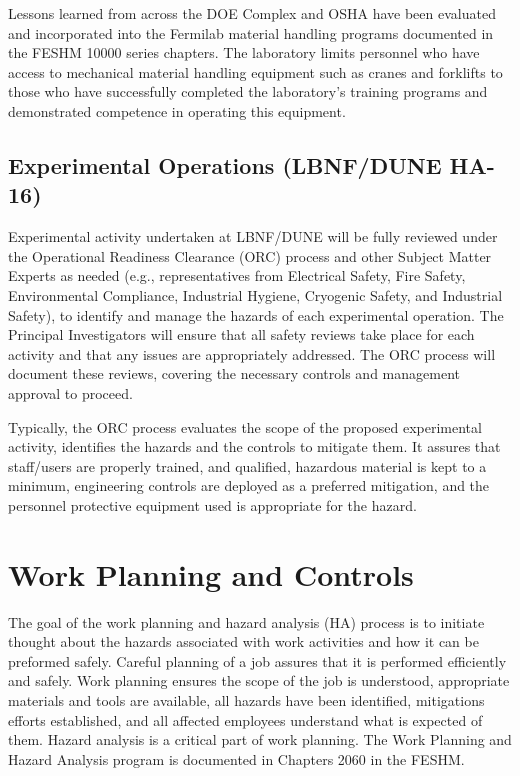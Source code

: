 Lessons learned from across the DOE Complex and OSHA have been
evaluated and incorporated into the Fermilab material handling
programs documented in the FESHM 10000 series chapters.  The
laboratory limits personnel who have access to mechanical material
handling equipment such as cranes and forklifts to those who have
successfully completed the laboratory's training programs and
demonstrated competence in operating this equipment.


\subsection{Experimental Operations (LBNF/DUNE HA-16)}

Experimental activity undertaken at LBNF/DUNE will be fully reviewed
under the Operational Readiness Clearance (ORC) process and other
Subject Matter Experts as needed (e.g., representatives from
Electrical Safety, Fire Safety, Environmental Compliance, Industrial
Hygiene, Cryogenic Safety, and Industrial Safety), to identify and
manage the hazards of each experimental operation. The Principal
Investigators will ensure that all safety reviews take place for each
activity and that any issues are appropriately addressed. The ORC
process will document these reviews, covering the necessary controls
and management approval to proceed.

Typically, the ORC process evaluates the scope of the proposed
experimental activity, identifies the hazards and the controls to
mitigate them. It assures that staff/users are properly trained, and
qualified, hazardous material is kept to a minimum, engineering
controls are deployed as a preferred mitigation, and the personnel
protective equipment used is appropriate for the hazard.

\section{Work Planning and Controls}

The goal of the work planning and hazard analysis (HA) process is to
initiate thought about the hazards associated with work activities and
how it can be preformed safely. Careful planning of a job assures that
it is performed efficiently and safely. Work planning ensures the
scope of the job is understood, appropriate materials and tools are
available, all hazards have been identified, mitigations efforts
established, and all affected employees understand what is expected of
them. Hazard analysis is a critical part of work planning.  The Work
Planning and Hazard Analysis program is documented in Chapters 2060 in
the FESHM.

